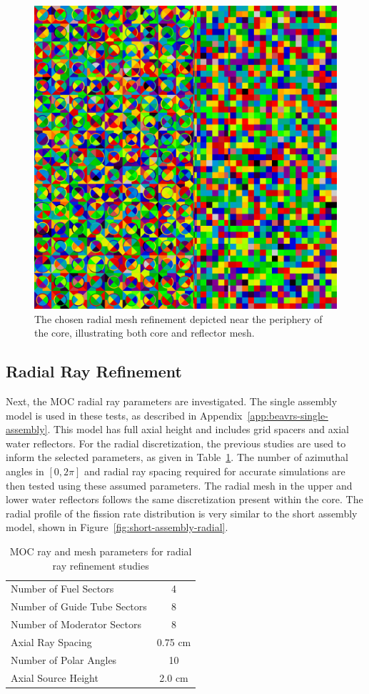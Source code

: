 \begin{figure}[h!]
	\centering
	\includegraphics[width=0.7\linewidth]{figures/moc-mesh-combined.png}
	\caption[]{The chosen radial mesh refinement depicted near the periphery of the core, illustrating both core and reflector mesh.}
	\label{fig:moc-mesh-combined}
\end{figure}


\subsection{Radial Ray Refinement}

Next, the \ac{MOC} radial ray parameters are investigated. The single assembly model is used in these tests, as described in Appendix~\ref{app:beavrs-single-assembly}. This model has full axial height and includes grid spacers and axial water reflectors. For the radial discretization, the previous studies are used to inform the selected parameters, as given in Table~\ref{tab:rad-ray-ref-params}. The number of azimuthal angles in $[0, 2\pi]$ and radial ray spacing required for accurate simulations are then tested using these assumed parameters. The radial mesh in the upper and lower water reflectors follows the same discretization present within the core. The radial profile of the fission rate distribution is very similar to the short assembly model, shown in Figure~\ref{fig:short-assembly-radial}.

\begin{table}[ht]
	\centering
	\caption{MOC ray and mesh parameters for radial ray refinement studies}
	\medskip
	\begin{tabular}{lc}
		\hline
		Number of Fuel Sectors & 4 \\
		Number of Guide Tube Sectors & 8 \\
		Number of Moderator Sectors & 8 \\
		Axial Ray Spacing & 0.75 cm \\
		Number of Polar Angles & 10 \\
		Axial Source Height & 2.0 cm \\
		\hline
	\end{tabular}
	\label{tab:rad-ray-ref-params}
\end{table}

